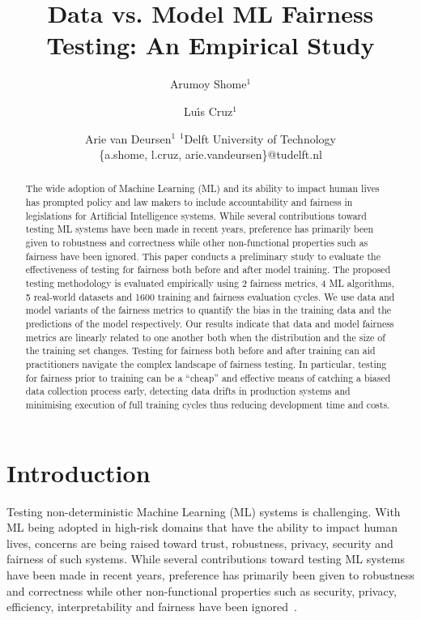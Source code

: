 \documentclass{article}
\title{Data vs. Model ML Fairness Testing: An Empirical Study}
\author{
  Arumoy Shome$^1$
  \and
  Lu{\'\i}s Cruz$^1$\and
  Arie van Deursen$^{1}$
  \affiliations
  $^1$Delft University of Technology\\
  \emails
  \{a.shome, l.cruz, arie.vandeursen\}@tudelft.nl
}
\begin{document}
\maketitle

\begin{abstract}
  The wide adoption of Machine Learning (ML) and its ability to impact
  human lives has prompted policy and law makers to include
  accountability and fairness in legislations for Artificial
  Intelligence systems. While several contributions toward testing ML
  systems have been made in recent years, preference has primarily
  been given to robustness and correctness while other non-functional
  properties such as fairness have been ignored. This paper conducts a
  preliminary study to evaluate the effectiveness of testing for
  fairness both before and after model training. The proposed testing
  methodology is evaluated empirically using 2 fairness metrics, 4 ML
  algorithms, 5 real-world datasets and 1600 training and fairness
  evaluation cycles. We use data and model variants of the fairness
  metrics to quantify the bias in the training data and the
  predictions of the model respectively. Our results indicate that
  data and model fairness metrics are linearly related to one another
  both when the distribution and the size of the training set changes.
  Testing for fairness both before and after training can aid
  practitioners navigate the complex landscape of fairness testing. In
  particular, testing for fairness prior to training can be a
  ``cheap'' and effective means of catching a biased data collection
  process early, detecting data drifts in production systems and
  minimising execution of full training cycles thus reducing
  development time and costs.
\end{abstract}

\section{Introduction}\label{sec:intro}

Testing non-deterministic Machine Learning (ML) systems is
challenging. With ML being adopted in high-risk domains that have the
ability to impact human lives, concerns are being raised toward trust,
robustness, privacy, security and fairness of such systems. While
several contributions toward testing ML systems have been made in
recent years, preference has primarily been given to robustness and
correctness while other non-functional properties such as security,
privacy, efficiency, interpretability and fairness have been
ignored \cite{zhang2020machine,zhang2021ignorance,mehrabi2021survey,wan2021modeling}.
\end{document}
